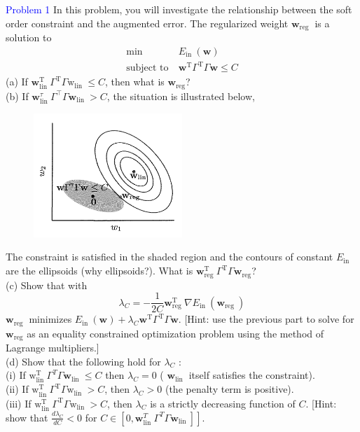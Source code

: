 \textcolor{blue}{Problem 1}
In this problem, you will investigate the relationship between the soft order constraint and the augmented error. The regularized weight $\mathbf{w}_{\text {reg }}$ is a solution to
\begin{align*}
\min &\ E_{\text {in }}(\mathbf{w}) \\
\text {subject to} &\ \mathbf{w}^{\mathrm{T}} \Gamma^{\mathrm{T}} \Gamma \mathbf{w} \leq C
\end{align*}
(a) If $\mathbf{w}_{\text {lin }}^{\mathrm{T}} \Gamma^{\mathrm{T}} \Gamma \mathrm{w}_{\text {lin }} \leq C$, then what is $\mathbf{w}_{\text{reg}}$?\\
(b) If $\mathbf{w}_{\text {lin }}^\tau \Gamma^{\top} \Gamma \mathbf{w}_{\text {lin }}>C$, the situation is illustrated below,
\begin{figure}[htbp]
    \center
    \includegraphics[width=0.5\textwidth]{../fig/p1.png}
\end{figure}

The constraint is satisfied in the shaded region and the contours of constant $E_{\text {in }}$ are the ellipsoids (why ellipsoids?). What is $\mathbf{w}_{\text {reg }}^{\mathrm{T}} \Gamma^{\mathrm{T}} \Gamma \mathbf{w}_{\mathrm{reg}}$?\\
(c) Show that with
$$
\lambda_C=-\frac{1}{2 C} \mathbf{w}_{\text {reg }}^{\mathrm{T}} \nabla E_{\text {in }}\left(\mathbf{w}_{\text {reg }}\right)
$$
$\mathbf{w}_{\text {reg }}$ minimizes $E_{\text {in }}(\mathbf{w})+\lambda_C \mathbf{w}^{\mathrm{T}} \Gamma^{\mathrm{T}} \Gamma \mathbf{w}$. [Hint: use the previous part to solve for $\mathbf{w}_{\text{reg}}$ as an equality constrained optimization problem using the method of Lagrange multipliers.]\\
(d) Show that the following hold for $\lambda_C$ :\\
(i) If $\mathrm{w}_{\text {lin }}^{\mathrm{T}} \Gamma^{T} \Gamma \mathbf{w}_{\text {lin }} \leq C$ then $\lambda_C=0$ ( $\mathbf{w}_{\text {lin }}$ itself satisfies the constraint).\\
(ii) If $\mathrm{w}_{\text {lin }}^{\mathrm{T}} \Gamma^{\mathrm{T}} \Gamma \mathrm{w}_{\text {lin }}>C$, then $\lambda_C>0$ (the penalty term is positive).\\
(iii) If $\mathrm{w}_{\text {lin }}^{\mathrm{T}} \Gamma^{\mathrm{T}} \Gamma \mathrm{w}_{\text {lin }}>C$, then $\lambda_C$ is a strictly decreasing function of $C$. [Hint: show that $\frac{d \lambda_C}{d C}<0$ for $\left.C \in\left[0, \mathbf{w}_{\text {lin }}^T \Gamma^T \Gamma \mathbf{w}_{\text {lin }}\right]\right]$.


